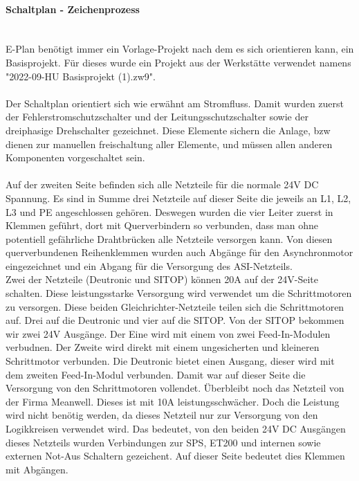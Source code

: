     \paragraph{Schaltplan - Zeichenprozess}\mbox{}\\
    E-Plan benötigt immer ein Vorlage-Projekt nach dem es sich orientieren kann, ein Basisprojekt. Für dieses wurde ein Projekt aus der Werkstätte verwendet namens "2022-09-HU Basisprojekt (1).zw9".\\\\ 
    Der Schaltplan orientiert sich wie erwähnt am Stromfluss. Damit wurden zuerst der Fehlerstromschutzschalter und der Leitungsschutzschalter sowie der dreiphasige Drehschalter gezeichnet. Diese Elemente sichern die Anlage, bzw dienen zur manuellen freischaltung aller Elemente, und müssen allen anderen Komponenten vorgeschaltet sein.\\\\
    Auf der zweiten Seite befinden sich alle Netzteile für die normale 24V DC Spannung. Es sind in Summe drei Netzteile auf dieser Seite die jeweils an L1, L2, L3 und PE angeschlossen gehören. Deswegen wurden die vier Leiter zuerst in Klemmen geführt, dort mit Querverbindern so verbunden, dass man ohne potentiell gefährliche Drahtbrücken alle Netzteile versorgen kann. Von diesen querverbundenen Reihenklemmen wurden auch Abgänge für den Asynchronmotor eingezeichnet und ein Abgang für die Versorgung des ASI-Netzteils.\\ Zwei der Netzteile (Deutronic und SITOP) können 20A auf der 24V-Seite schalten. Diese leistungsstarke Versorgung wird verwendet um die Schrittmotoren zu versorgen. Diese beiden Gleichrichter-Netzteile teilen sich die Schrittmotoren auf. Drei auf die Deutronic und vier auf die SITOP. Von der SITOP bekommen wir zwei 24V Ausgänge. Der Eine wird mit einem von zwei Feed-In-Modulen verbudnen. Der Zweite wird direkt mit einem ungesicherten und kleineren Schrittmotor verbunden. Die Deutronic bietet einen Ausgang, dieser wird mit dem zweiten Feed-In-Modul verbunden. Damit war auf dieser Seite die Versorgung von den Schrittmotoren vollendet. Überbleibt noch das Netzteil von der Firma Meanwell. Dieses ist mit 10A leistungsschwächer. Doch die Leistung wird nicht benötig werden, da dieses Netzteil nur zur Versorgung von den Logikkreisen verwendet wird. Das bedeutet, von den beiden 24V DC Ausgängen dieses Netzteils wurden Verbindungen zur SPS, ET200 und internen sowie externen Not-Aus Schaltern gezeichent. Auf dieser Seite bedeutet dies Klemmen mit Abgängen.\\    
